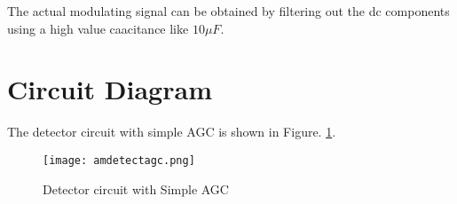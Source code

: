 The actual modulating signal can be obtained by  filtering out the dc components using a high value caacitance like  $10\mu F$.

%
%

\section*{Circuit Diagram}
The detector circuit with simple AGC is shown in Figure. \ref{detectagcckt}.%
\begin{figure}

\texttt{[image: amdetectagc.png]}
\caption{Detector circuit with Simple AGC}
\label{detectagcckt}
\end{figure}

%
